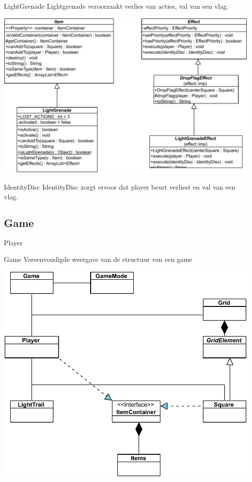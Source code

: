 \documentclass[11pt,t]{beamer}
\begin{document}
\begin{frame}{LightGrenade}
Lightgrenade veroorzaakt verlies van acties, val van een vlag.
\begin{center}
\includegraphics[width= 0.85\linewidth]{images/lightgrenadeeffect}
\end{center}
\end{frame}

\begin{frame}{IdentityDisc}
IdentityDisc zorgt ervoor dat player beurt verliest en val van een vlag.
\begin{center}

\end{center}
\end{frame}

\subsection{Game}

\begin{frame}{Player}
\end{frame}

\begin{frame}{Game}
Vereenvoudigde weergave van de structuur van een game
\begin{center}
\includegraphics[scale=0.5]{images/simple}
\end{center}
\end{frame}
\end{document}

